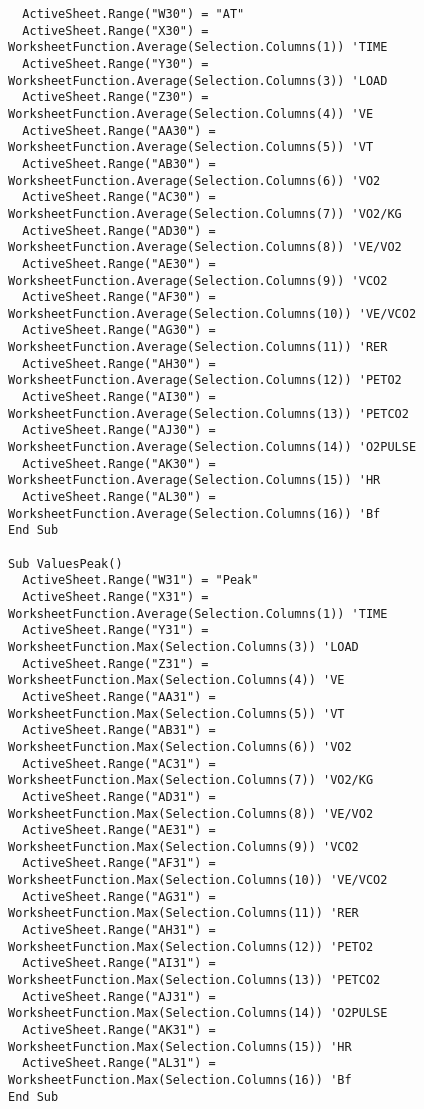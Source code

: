 \begin{lstlisting}
  ActiveSheet.Range("W30") = "AT"
  ActiveSheet.Range("X30") = WorksheetFunction.Average(Selection.Columns(1)) 'TIME
  ActiveSheet.Range("Y30") = WorksheetFunction.Average(Selection.Columns(3)) 'LOAD
  ActiveSheet.Range("Z30") = WorksheetFunction.Average(Selection.Columns(4)) 'VE
  ActiveSheet.Range("AA30") = WorksheetFunction.Average(Selection.Columns(5)) 'VT
  ActiveSheet.Range("AB30") = WorksheetFunction.Average(Selection.Columns(6)) 'VO2
  ActiveSheet.Range("AC30") = WorksheetFunction.Average(Selection.Columns(7)) 'VO2/KG
  ActiveSheet.Range("AD30") = WorksheetFunction.Average(Selection.Columns(8)) 'VE/VO2
  ActiveSheet.Range("AE30") = WorksheetFunction.Average(Selection.Columns(9)) 'VCO2
  ActiveSheet.Range("AF30") = WorksheetFunction.Average(Selection.Columns(10)) 'VE/VCO2
  ActiveSheet.Range("AG30") = WorksheetFunction.Average(Selection.Columns(11)) 'RER
  ActiveSheet.Range("AH30") = WorksheetFunction.Average(Selection.Columns(12)) 'PETO2
  ActiveSheet.Range("AI30") = WorksheetFunction.Average(Selection.Columns(13)) 'PETCO2
  ActiveSheet.Range("AJ30") = WorksheetFunction.Average(Selection.Columns(14)) 'O2PULSE
  ActiveSheet.Range("AK30") = WorksheetFunction.Average(Selection.Columns(15)) 'HR
  ActiveSheet.Range("AL30") = WorksheetFunction.Average(Selection.Columns(16)) 'Bf
End Sub

Sub ValuesPeak()
  ActiveSheet.Range("W31") = "Peak"
  ActiveSheet.Range("X31") = WorksheetFunction.Average(Selection.Columns(1)) 'TIME
  ActiveSheet.Range("Y31") = WorksheetFunction.Max(Selection.Columns(3)) 'LOAD
  ActiveSheet.Range("Z31") = WorksheetFunction.Max(Selection.Columns(4)) 'VE
  ActiveSheet.Range("AA31") = WorksheetFunction.Max(Selection.Columns(5)) 'VT
  ActiveSheet.Range("AB31") = WorksheetFunction.Max(Selection.Columns(6)) 'VO2
  ActiveSheet.Range("AC31") = WorksheetFunction.Max(Selection.Columns(7)) 'VO2/KG
  ActiveSheet.Range("AD31") = WorksheetFunction.Max(Selection.Columns(8)) 'VE/VO2
  ActiveSheet.Range("AE31") = WorksheetFunction.Max(Selection.Columns(9)) 'VCO2
  ActiveSheet.Range("AF31") = WorksheetFunction.Max(Selection.Columns(10)) 'VE/VCO2
  ActiveSheet.Range("AG31") = WorksheetFunction.Max(Selection.Columns(11)) 'RER
  ActiveSheet.Range("AH31") = WorksheetFunction.Max(Selection.Columns(12)) 'PETO2
  ActiveSheet.Range("AI31") = WorksheetFunction.Max(Selection.Columns(13)) 'PETCO2
  ActiveSheet.Range("AJ31") = WorksheetFunction.Max(Selection.Columns(14)) 'O2PULSE
  ActiveSheet.Range("AK31") = WorksheetFunction.Max(Selection.Columns(15)) 'HR
  ActiveSheet.Range("AL31") = WorksheetFunction.Max(Selection.Columns(16)) 'Bf
End Sub


\end{lstlisting}
